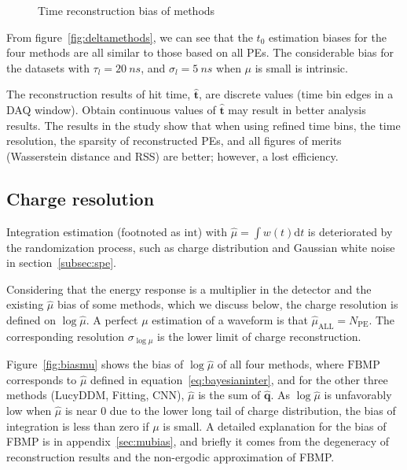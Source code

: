 \begin{figure}[H]
    \centering
    \resizebox{\textwidth}{!}{}
    \caption{\label{fig:biasmethods} Time reconstruction bias of methods}
\end{figure}

From figure~\ref{fig:deltamethods}, we can see that the $t_0$ estimation biases for the four methods are all similar to those based on all PEs. The considerable bias for the datasets with $\tau_l=\SI{20}{ns}$, and $\sigma_l=\SI{5}{ns}$ when $\mu$ is small is intrinsic. 


The reconstruction results of hit time, $\bm{\hat{t}}$, are discrete values (time bin edges in a DAQ window). Obtain continuous values of $\bm{\hat{t}}$ may result in better analysis results. The results in the study show that when using refined time bins, the time resolution, the sparsity of reconstructed PEs, and all figures of merits (Wasserstein distance and RSS) are better; however, a lost efficiency. 

\subsection{Charge resolution}
\label{subsec:chargereconstruction}

Integration estimation (footnoted as $\mathrm{int}$) with $\hat{\mu}=\int w(t)\mathrm{d}t$ is deteriorated by the randomization process, such as charge distribution and Gaussian white noise in section~\ref{subsec:spe}. 

Considering that the energy response is a multiplier in the detector and the existing $\hat{\mu}$ bias of some methods, which we discuss below, the charge resolution is defined on $\log{\hat{\mu}}$. A perfect $\mu$ estimation of a waveform is that $\hat{\mu}_\mathrm{ALL}=N_\mathrm{PE}$. The corresponding resolution $\sigma_{\log\mu}$ is the lower limit of charge reconstruction. 

Figure~\ref{fig:biasmu} shows the bias of $\log\hat{\mu}$ of all four methods, where $\mathrm{FBMP}$ corresponds to $\hat{\mu}$ defined in equation~\eqref{eq:bayesianinter}, and for the other three methods (LucyDDM, Fitting, CNN), $\hat{\mu}$ is the sum of $\hat{\bm{q}}$. As $\log\hat{\mu}$ is unfavorably low when $\hat{\mu}$ is near 0 due to the lower long tail of charge distribution, the bias of integration is less than zero if $\mu$ is small. A detailed explanation for the bias of FBMP is in appendix~\ref{sec:mubias}, and briefly it comes from the degeneracy of reconstruction results and the non-ergodic approximation of FBMP. 

